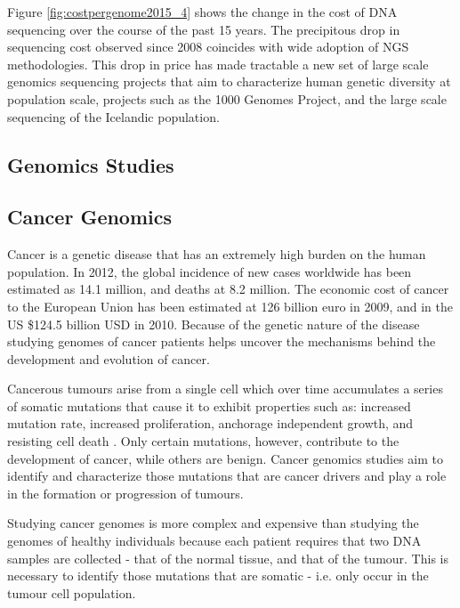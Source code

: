Figure \ref{fig:costpergenome2015_4} shows the change in the cost of DNA sequencing over the course of the past 15 years. The precipitous drop in sequencing cost observed since 2008 coincides with wide adoption of NGS methodologies. This drop in price has made tractable a new set of large scale genomics sequencing projects that aim to characterize human genetic diversity at population scale, projects such as the 1000 Genomes Project\autocite{10002010map}, and the large scale sequencing of the Icelandic population\autocite{gudbjartsson2015large}.

\subsection{Genomics Studies}

\subsection{Cancer Genomics}
Cancer is a genetic disease that has an extremely high burden on the human population. In 2012, the global incidence of new cases worldwide has been estimated as 14.1 million, and deaths at 8.2 million\autocite{torre2015global}. The economic cost of cancer to the European Union has been estimated at 126 billion euro in 2009\autocite{luengo2013economic}, and in the US \$124.5 billion USD in 2010\autocite{yabroff2011economic}. Because of the genetic nature of the disease studying genomes of cancer patients helps uncover the mechanisms behind the development and evolution of cancer\autocite{stratton2009cancer}.

Cancerous tumours arise from a single cell which over time accumulates a series of somatic mutations that cause it to exhibit properties such as: increased mutation rate, increased proliferation, anchorage independent growth, and resisting cell death\autocite{hanahan2011hallmarks} . Only certain mutations, however, contribute to the development of cancer, while others are benign. Cancer genomics studies aim to identify and characterize those mutations that are cancer drivers and play a role in the formation or progression of tumours\autocite{stratton2009cancer}. 

Studying cancer genomes is more complex and expensive than studying the genomes of healthy individuals because each patient requires that two DNA samples are collected - that of the normal tissue, and that of the tumour. This is necessary to identify those mutations that are somatic - i.e. only occur in the tumour cell population\autocite{roberts2013comparative}.


